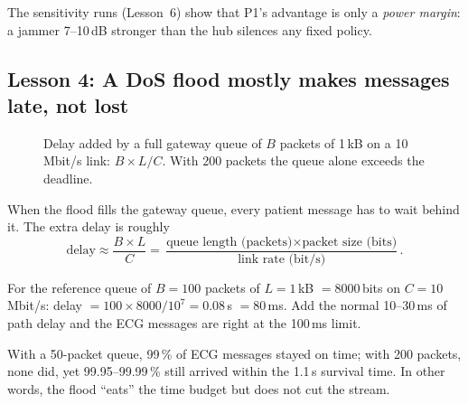 \documentclass[11pt,a4paper]{article}
\begin{document}
The sensitivity runs (Lesson~6) show that P1's advantage is only a \emph{power margin}: a jammer 7--10\,dB stronger than the hub silences any fixed policy.

\subsection{Lesson 4: A DoS flood mostly makes messages late, not lost}

\begin{figure}[h]
\centering
{}
\caption{Delay added by a full gateway queue of $B$ packets of 1\,kB on a 10\,Mbit/s link: $B\times L/C$. With 200 packets the queue alone exceeds the deadline.}\label{fig:dos}
\end{figure}

When the flood fills the gateway queue, every patient message has to wait behind it. The extra delay is roughly
\[
\text{delay} \approx \frac{B\times L}{C} = \frac{\text{queue length (packets)}\times\text{packet size (bits)}}{\text{link rate (bit/s)}}.
\]
\begin{example}
For the reference queue of $B = 100$ packets of $L = 1$\,kB $= 8000$\,bits on $C = 10$\,Mbit/s: delay $= 100\times8000/10^7 = 0.08$\,s $= 80$\,ms. Add the normal 10--30\,ms of path delay and the ECG messages are right at the 100\,ms limit.
\end{example}

With a 50-packet queue, 99\,\% of ECG messages stayed on time; with 200 packets, none did, yet 99.95--99.99\,\% still arrived within the 1.1\,s survival time. In other words, the flood ``eats'' the time budget but does not cut the stream.
\end{document}

